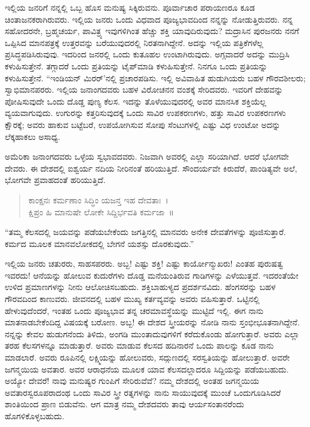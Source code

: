 ಇಲ್ಲಿಯ ಜನರಿಗೆ ನನ್ನಲ್ಲಿ ಒಬ್ಬ ಹೊಸ ಮನುಷ್ಯ ಸಿಕ್ಕಿರುವನು. ಪೂರ್ವಾಚಾರ ಪರಾಯಣರೂ ಕೂಡ ಚಿಂತಾಜನಕರಾಗಿರುವರು. ಇಲ್ಲಿಯ ಜನರು ಒಂದು ವಿಧವಾದ ಪೂಜ್ಯಭಾವದಿಂದ ನನ್ನನ್ನು ನೋಡುತ್ತಿರುವರು. ನನ್ನ ಸಹೋದರನೇ, ಬ್ರಹ್ಮಚರ್ಯ, ಪಾವಿತ್ರ್ಯ ಇವುಗಳಿಗಿಂತ ಹೆಚ್ಚು ಶಕ್ತಿ ಯಾವುದಿರುವುದು? ಮದ್ರಾಸಿನ ಪುರಜನರು ನನಗೆ ಒಪ್ಪಿಸಿದ ಮಾನಪತ್ರಕ್ಕೆ ಉತ್ತರವನ್ನು ಬರೆಯುವುದರಲ್ಲಿ ನಿರತನಾಗಿದ್ದೇನೆ. ಅದನ್ನು ಇಲ್ಲಿಯ ಪತ್ರಿಕೆಗಳೆಲ್ಲ ಪ್ರಸಿದ್ಧಪಡಿಸಿರುವುವು. ಇದರಿಂದ ಜನರಲ್ಲಿ ಒಂದು ಕುತೂಹಲ ಉಂಟಾಗಿರುವುದು. ಅಗ್ಗವಾದರೆ ಅದನ್ನು ಮುದ್ರಿಸಿ ಕಳುಹಿಸುತ್ತೇನೆ. ತಗ್ಗಾದರೆ ಒಂದು ಪ್ರತಿಯನ್ನು ಟೈಪ್‌ಮಾಡಿ ಕಳುಹಿಸುತ್ತೇನೆ. ನಿನಗೂ ಒಂದು ಪ್ರತಿಯನ್ನು ಕಳುಹಿಸುತ್ತೇನೆ. “ಇಂಡಿಯನ್ ಮಿರರ್’ನಲ್ಲಿ ಪ್ರಚಾರಪಡಿಸು. ಇಲ್ಲಿ ಅವಿವಾಹಿತ ಹುಡುಗಿಯರು ಬಹಳ ಗೌರವಶೀಲರು; ಸ್ವಾಭಿಮಾನಪರರು. ಇಲ್ಲಿಯ ಜನಾಂಗದವರು ಬಹಳ ವಿರೋಚನನ ವಂಶಕ್ಕೆ ಸೇರಿದವರು. ಇವರಿಗೆ ದೇಹವನ್ನು ಪೋಷಿಸುವುದೇ ಒಂದು ದೊಡ್ಡ ಪುಣ್ಯ ಕೆಲಸ. ಇದನ್ನು ತೊಳೆಯುವುದರಲ್ಲಿ ಅವರ ಮಾನಸಿಕ ಶಕ್ತಿಯೆಲ್ಲ ವ್ಯಯವಾಗುವುದು. ಉಗುರನ್ನು ಕತ್ತರಿಸುವುದಕ್ಕೆ ಒಂದು ಸಾವಿರ ಉಪಕರಣಗಳು, ಹತ್ತು ಸಾವಿರ ಉಪಕರಣಗಳು ಕ್ಷೌರಕ್ಕೆ; ಅವರು ಹಾಕುವ ಬಟ್ಟೆಬರೆ, ಉಪಯೋಗಿಸುವ ಸೋಪು ಸೆಂಟುಗಳಲ್ಲಿ ಎಷ್ಟು ವಿಧ ಉಂಟೋ ಅದನ್ನು ಲೆಕ್ಕಹಾಕಲು ಅಸಾಧ್ಯ.

ಅಮೆರಿಕಾ ಜನಾಂಗದವರು ಒಳ್ಳೆಯ ಸ್ವಭಾವದವರು. ನಿಜವಾಗಿ ಅವರಲ್ಲಿ ಎಲ್ಲಾ ಸರಿಯಾಗಿದೆ. ಆದರೆ ಭೋಗವೇ ದೇವರು. ಈ ದೇಶದಲ್ಲಿ ಐಶ್ವರ್ಯ ನದಿಯ ನೀರಿನಂತೆ ಹರಿಯುತ್ತಿದೆ. ಸೌಂದರ್ಯವೇ ಕಿರುದೆರೆ, ಪಾಂಡಿತ್ಯವೇ ಅಲೆ, ಭೋಗವೇ ಪ್ರವಾಹದಂತೆ ಹರಿಯುತ್ತಿದೆ.

\begin{verse}
 ಕಾಂಕ್ಷನಃ ಕರ್ಮಣಾಂ ಸಿದ್ಧಿಂ ಯಜನ್ತ ಇಹ ದೇವತಾಃ~।\\
 ಕ್ಷಿಪ್ರಂ ಹಿ ಮಾನುಷೇ ಲೋಕೇ ಸಿದ್ದಿರ್ಭವತಿ ಕರ್ಮಜಾ~॥   
\end{verse}


“ತಮ್ಮ ಕೆಲಸದಲ್ಲಿ ಜಯವನ್ನು ಪಡೆಯಬೇಕೆಂದು ಜಗತ್ತಿನಲ್ಲಿ ಮಾನವರು ಅನೇಕ ದೇವತೆಗಳನ್ನು ಪೂಜಿಸುತ್ತಾರೆ. ಕರ್ಮದ ಮೂಲಕ ಮಾನವಲೋಕದಲ್ಲಿ ಬೇಗನೆ ಯಶಸ್ಸು ದೊರಕುವುದು.”

ಇಲ್ಲಿಯ ಜನರು ಚತುರರು, ಸಾಹಸಪರರು. ಅಬ್ಬ! ಎಷ್ಟು ಶಕ್ತಿ! ಎಷ್ಟು \break ಕಾರ್ಯೋನ್ಮುಖರು! ಎಂತಹ ಪುರುಷತ್ವ ಇವರದು! ಆನೆಯನ್ನು ಹೋಲುವ ಕುದುರೆಗಳು ದೊಡ್ಡ ಮನೆಯಂತಿರುವ ಗಾಡಿಗಳನ್ನು ಎಳೆಯುತ್ತವೆ. ಇದರಂತೆಯೇ ಉಳಿದ ಪ್ರಮಾಣಗಳನ್ನು ನೀನು ಆಲೋಚಿಸಬಹುದು. ಶಕ್ತಿಬಾಹುಳ್ಯದ ಪ್ರದರ್ಶನವಿದು. ಹೆಂಗಸರನ್ನು ಬಹಳ ಗೌರವದಿಂದ ಕಾಣುವರು. ಜೀವನದಲ್ಲಿ ಬಹಳ ಮುಖ್ಯ ಕರ್ತವ್ಯವನ್ನು ಅವರು ವಹಿಸುತ್ತಾರೆ. ಒಟ್ಟಿನಲ್ಲಿ ಹೇಳುವುದೆಂದರೆ, ಇಂತಹ ಒಂದು ಪೂಜ್ಯಭಾವ ತನ್ನ ಚರಮಾವಸ್ಥೆಯನ್ನು ಮುಟ್ಟಿದೆ ಇಲ್ಲಿ. ಈಗ ನಾನು ಮಾತನಾಡಬೇಕೆಂದಿದ್ದ ವಿಷಯಕ್ಕೆ ಬರೋಣ. ಅಬ್ಬ! ಈ ದೇಶದ ಸ್ತ್ರೀಯರನ್ನು ನೋಡಿ ನಾನು ಸ್ತಂಭೀಭೂತನಾಗಿದ್ದೇನೆ. ನನ್ನನ್ನು ಕೇವಲ ಹುಡುಗನೆಂದು ತಿಳಿದು, ಅಂಗಡಿ ಮುಂತಾದುವುಗಳಿಗೆ ಕರೆದುಕೊಂಡು ಹೋಗುತ್ತಾರೆ. ಅವರು ಎಲ್ಲಾ ತರಹ ಕೆಲಸಗಳನ್ನೂ ಮಾಡುತ್ತಾರೆ. ಅವರು ಮಾಡುವ ಕೆಲಸದ ಹದಿನಾರನೆ ಒಂದು ಪಾಲನ್ನು ಕೂಡ ನಾನು ಮಾಡಲಾರೆ. ಅವರು ರೂಪಿನಲ್ಲಿ ಲಕ್ಷ್ಮಿಯನ್ನು ಹೋಲುವರು, ಸದ್ಗುಣದಲ್ಲಿ ಸರಸ್ವತಿಯನ್ನು ಹೋಲುತ್ತಾರೆ. ಅವರೇ ಜಗನ್ಮಯಿಯ ಅವತಾರ. ಅವರ ಆರಾಧನೆಯ ಮೂಲಕ ಯಾವ ಕೆಲಸದಲ್ಲಾದರೂ ಸಿದ್ದಿಯನ್ನು ಪಡೆಯಬಹುದು. ಅಯ್ಯೋ ದೇವರೆ! ನಾವು ಮನುಷ್ಯರ ಗುಂಪಿಗೆ ಸೇರಿರುವೆವೆ? ನಮ್ಮ ದೇಶದಲ್ಲಿ ಅಂತಹ ಜಗನ್ಮಯಿಯ ಅವತಾರಸ್ವರೂಪರಾದಂಥ ಒಂದು ಸಾವಿರ ಸ್ತ್ರೀ ರತ್ನಗಳನ್ನು ನಾನು ಸಾಯುವುದಕ್ಕೆ ಮುಂಚೆ ಒಂದುಗೂಡಿಸಿದರೆ ಶಾಂತಿಯಿಂದ ಪ್ರಾಣ ಬಿಡುವೆನು. ಆಗ ಮಾತ್ರ ನಮ್ಮ ದೇಶದವರು ತಾವು ಆರ್ಯಸಂತಾನರೆಂದು ಹೊಗಳಿಕೊಳ್ಳಬಹುದು.


